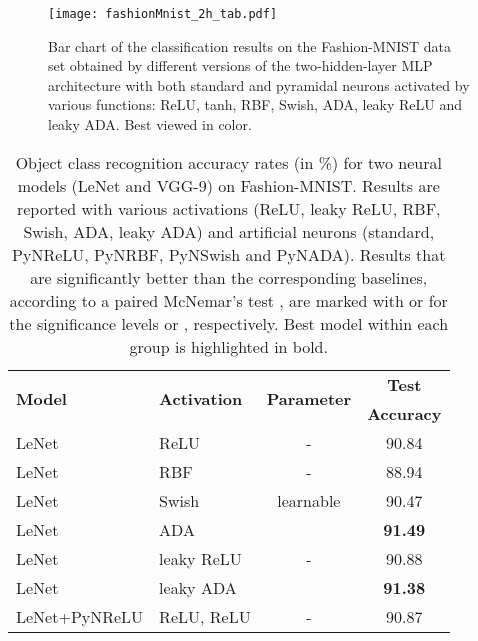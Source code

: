 \documentclass[pdflatex,sn-mathphys]{sn-jnl}
\theoremstyle{thmstyleone}
\theoremstyle{thmstyletwo}\newtheorem{example}{Example}\newtheorem{remark}{Remark}
\theoremstyle{thmstylethree}\newtheorem{definition}{Definition}\DeclareMathOperator{\sinc}{sinc}
\begin{document}
\begin{figure}[!t]
\begin{center}
\centerline{\texttt{[image: fashionMnist\_2h\_tab.pdf]}}
\caption{Bar chart of the classification results on the Fashion-MNIST data set obtained by different versions of the two-hidden-layer MLP \cite{Xiao-A-2017} architecture with both standard and pyramidal neurons activated by various functions: ReLU, tanh, RBF, Swish, ADA, leaky ReLU and leaky ADA. Best viewed in color.}
\label{fig_tab_fashion_2h}
\end{center}
\end{figure}

\begin{table}[!t]
\caption{\small{Object class recognition accuracy rates (in \%) for two neural models (LeNet and VGG-9) on Fashion-MNIST. Results are reported with various activations (ReLU, leaky ReLU, RBF, Swish, ADA, leaky ADA) and artificial neurons (standard, PyNReLU, PyNRBF, PyNSwish and PyNADA). Results that are significantly better than the corresponding baselines, according to a paired McNemar's test \citep{Dietterich-NC-1998}, are marked with  or  for the significance levels  or , respectively. Best model within each group is highlighted in bold.}}
\label{tab_Fashion_MNIST_b}
\scriptsize{
\begin{center}
\begin{tabular}{llcc}
\toprule
\multirow{2}{*}{\bf Model}                           & \multirow{2}{*}{\bf Activation}        & \multirow{2}{*}{\bf Parameter}             & {\bf Test}\\
&        &             & {\bf Accuracy}\\
\midrule
LeNet                           & ReLU		        & -	                    & 90.84\\
LeNet                           & RBF 		        & -                     & 88.94\\
LeNet                           & Swish             & learnable     & 90.47\\
LeNet                           & ADA 		        &           & {\bf 91.49}\\
\midrule
LeNet                           & leaky ReLU	    & -                     & 90.88\\
LeNet                           & leaky ADA 	    & 	        & {\bf 91.38}\\
\midrule
LeNet+PyNReLU                   & ReLU, ReLU 	    &-   	                & 90.87\\

\end{tabular}
\end{center}}
\end{table}
\end{document}
